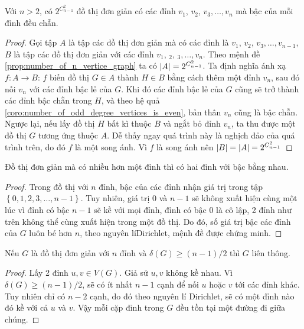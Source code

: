 \begin{proposition}
	Với $n > 2$, có $2^{C_{n-1}^2}$ đồ thị đơn giản có các đỉnh $v_1$, $v_2$, $v_3, \ldots, v_n$ mà bậc của mỗi đỉnh đều chẵn.
	\begin{proof}
		Gọi tập $A$ là tập các đồ thị đơn giản mà có các đỉnh là $v_1$, $v_2$, $v_3, \ldots, v_{n-1}$, $B$ là tập các đồ thị đơn giản với các đỉnh $v_1$, $_2$, $_3,\ldots,v_n$. Theo mệnh đề \ref{prop:number_of_n_vertice_graph} ta có $\left\lvert A\right\rvert = 2^{C_{n-1}^2}$. Ta định nghĩa ánh xạ $f:A\to B$: $f$ biến đồ thị $G \in A$ thành $H \in B$ bằng cách thêm một đỉnh $v_n$, sau đó nối $v_n$ với các đỉnh bậc lẻ của $G$. Khi đó các đỉnh bậc lẻ của $G$ cũng sẽ trở thành các đỉnh bậc chẵn trong $H$, và theo hệ quả \ref{coro:number_of_odd_degree_vertices_is_even}, bản thân $v_n$ cũng là bậc chẵn. Ngược lại, nếu lấy đồ thị $H$ bất kì thuộc $B$ và ngắt bỏ đỉnh $v_n$, ta thu được một đồ thị $G$ tương ứng thuộc $A$. Dễ thấy ngay quá trình này là nghịch đảo của quá trình trên, do đó $f$ là một song ánh. Vì $f$ là song ánh nên $\left\lvert B\right\rvert = \left\lvert A\right\rvert = 2^{C_{n-1}^2}$
	\end{proof}
\end{proposition}

\begin{proposition}
	Đồ thị đơn giản mà có nhiều hơn một đỉnh thì có hai đỉnh với bậc bằng nhau.
	\begin{proof}
		Trong đồ thị với $n$ đỉnh, bậc của các đỉnh nhận giá trị trong tập $\left\{0,1,2,3,\ldots,n-1\right\}$. Tuy nhiên, giá trị $0$ và $n-1$ sẽ không xuất hiện cùng một lúc vì đỉnh có bậc $n-1$ sẽ kề với mọi đỉnh, đỉnh có bậc $0$ là cô lập, 2 đỉnh như trên không thể cùng xuất hiện trong một đồ thị. Do đó, số giá trị bậc các đỉnh của $G$ luôn bé hơn $n$, theo nguyên líDirichlet, mệnh đề được chứng minh.
	\end{proof}
\end{proposition}
\begin{proposition}
	Nếu $G$ là đồ thị đơn giản với $n$ đỉnh và $\delta(G) \ge (n-1)/2$ thì $G$ liên thông.
	\begin{proof}
		Lấy 2 đỉnh $u,v \in V(G)$. Giả sử $u,v$ không kề nhau. Vì $\delta(G) \ge (n-1)/2$, sẽ có ít nhất $n-1$ cạnh để nối $u$ hoặc $v$ tới các đỉnh khác. Tuy nhiên chỉ có $n-2$ cạnh, do đó theo nguyên lí Dirichlet, sẽ có một đỉnh nào đó kề với cả $u$ và $v$. Vậy mỗi cặp đỉnh trong $G$ đều tồn tại một đường đi giữa chúng.
	\end{proof}
\end{proposition}

